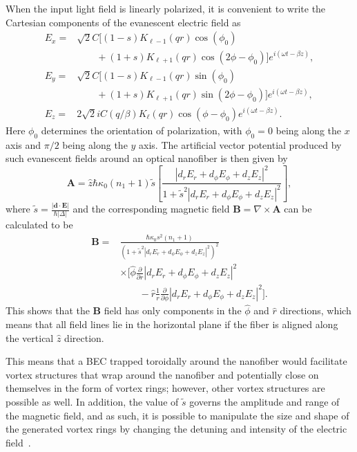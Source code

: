 When the input light field is linearly polarized, it is convenient to write the  Cartesian components of the evanescent electric field as 
\begin{align}
E_x =& \sqrt 2 C\Big[(1-s)K_{\ell-1}(qr)\cos(\phi_0)\nonumber \\
      &\qquad+(1+s)K_{\ell+1}(qr)\cos(2\phi-\phi_0)\Big]e^{i(\omega t - \beta z)}, \\
E_y = &\sqrt 2 C\Big[(1-s)K_{\ell-1}(qr)\sin(\phi_0)\nonumber \\
      &\qquad+(1+s)K_{\ell+1}(qr)\sin(2\phi-\phi_0)\Big]e^{i(\omega t - \beta z)}, \\
E_z = & 2\sqrt 2 i C(q/\beta)K_\ell(qr)\cos(\phi - \phi_0)e^{i(\omega t - \beta z)}.
\end{align}
Here $\phi_0$ determines the orientation of polarization, with $\phi_0 = 0$ being along the $x$ axis and $\pi/2$ being along the $y$ axis.
The artificial vector potential produced by such evanescent fields around an optical nanofiber is then given by \cite{sachdeva2017}
\begin{equation}
\mathbf{A} = \hat{z} \hbar \kappa_0 (n_1 + 1) \tilde{s} \left[\frac{|d_rE_r + d_{\phi}E_{\phi} + d_zE_z|^2}{1 + \tilde s^2|d_rE_r + d_{\phi}E_{\phi} + d_zE_z|^2} \right],
\end{equation}
where $\tilde s = \frac{|\mathbf{d}\cdot\mathbf{E}|}{\hbar |\Delta|}$ and
the corresponding magnetic field $\mathbf{B} = \nabla \times \mathbf{A}$ can be calculated to be
\begin{align}
\mathbf{B} =& \frac{\hbar \kappa_0 s^2(n_1 + 1)}{(1+\tilde s^2|d_rE_r + d_{\phi}E_{\phi} + d_zE_z|^2)^2} \nonumber\\
&\times \bigg[ \hat\phi  \frac{\partial}{\partial r} |d_rE_r + d_{\phi}E_{\phi} + d_zE_z|^2 \nonumber\\
&\qquad- \hat r \frac{1}{r} \frac{\partial}{\partial \phi} |d_rE_r + d_{\phi}E_{\phi} + d_zE_z|^2 \bigg ].
\end{align}
This shows that the $\mathbf{B}$ field has only components in the $\hat \phi$ and $\hat r$ directions, which means that all field lines lie in the horizontal plane if the fiber is aligned along the vertical $\hat z$ direction.

This means that a BEC trapped toroidally around the nanofiber would facilitate vortex structures that wrap around the nanofiber and potentially close on themselves in the form of vortex rings; however, other vortex structures are possible as well.
In addition, the value of $\tilde s$ governs the amplitude and range of the magnetic field, and as such, it is possible to manipulate the size and shape of the generated vortex rings by changing the detuning and intensity of the electric field~\cite{sachdeva2017}.

